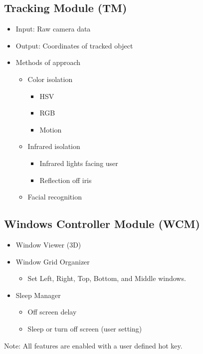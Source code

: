 \documentclass[12pt]{article}
\begin{document}
\subsection{Tracking Module (TM)}
\begin{itemize}
	\item Input: Raw camera data
	\item Output: Coordinates of tracked object
	\item Methods of approach
	\begin{itemize}
		\item{Color isolation}
		\begin{itemize}
			\item{HSV}
			\item{RGB}
			\item{Motion}
		\end{itemize}
	\end{itemize}
	\begin{itemize}
		\item{Infrared isolation}
		\begin{itemize}
			\item Infrared lights facing user
			\item Reflection off iris
		\end{itemize}
		\item{Facial recognition}
	\end{itemize}
\end{itemize}	

\subsection{Windows Controller Module (WCM)}
\begin{itemize}
	\item{Window Viewer (3D)}
	\item{Window Grid Organizer}
	\begin{itemize}
		\item{Set Left, Right, Top, Bottom, and Middle windows.}
	\end{itemize}
	\item{Sleep Manager}
	\begin{itemize}
		\item{Off screen delay}
		\item{Sleep or turn off screen (user setting)}
	\end{itemize}
\end{itemize}
Note: All features are enabled with a user defined hot key.
\end{document}

